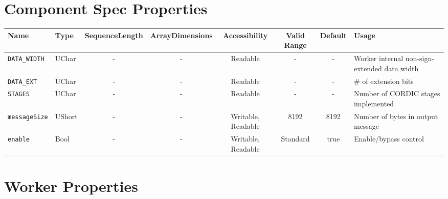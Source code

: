 \documentclass{article}
\begin{document}
\begin{landscape}
	\section*{Component Spec Properties}
	\begin{scriptsize}
		\begin{tabular}{|p{3cm}|p{1.5cm}|c|c|c|c|c|p{7cm}|}
			\hline
			\rowcolor{blue}
			Name               & Type   & SequenceLength & ArrayDimensions & Accessibility      & Valid Range & Default & Usage                                        \\
			\hline
			\verb+DATA_WIDTH+  & UChar  & -              & -               & Readable           & -           & -       & Worker internal non-sign-extended data width \\
			\hline
			\verb+DATA_EXT+    & UChar  & -              & -               & Readable           & -           & -       & \# of extension bits                         \\
			\hline
			\verb+STAGES+      & UChar  & -              & -               & Readable           & -           & -       & Number of CORDIC stages implemented          \\
			\hline
			\verb+messageSize+ & UShort & -              & -               & Writable, Readable & 8192        & 8192    & Number of bytes in output message            \\
			\hline
			\verb+enable+      & Bool   & -              & -               & Writable, Readable & Standard    & true    & Enable/bypass control                        \\
			\hline
		\end{tabular}
	\end{scriptsize}

	\section*{Worker Properties}

\end{landscape}
\end{document}
